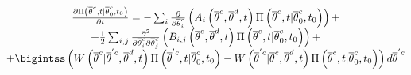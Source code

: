\begin{equation}
\label{eq:CK}
\begin{matrix}
\frac{\partial \Pi \left (\overline{\theta}^{c},t|\overline{\theta}_{0}^{c},t_{0}  
\right ) }{\partial t} = - \sum_i \frac{\partial }{\partial \overline{\theta}_{i}^{c}} \left ( A_{i}\left (  \overline{\theta}^{c}, \overline{\theta}^{d}, t\right ) \Pi \left (\overline{\theta}^{c},t|\overline{\theta}_{0}^{c},t_{0}  
\right )  \right ) + 
\\
+ \frac{1}{2}\sum_{i,j} \frac{\partial^2 }{\partial \overline{\theta}^{c}_{i} \partial \overline{\theta}^{c}_{j}}\left ( B_{i,j}\left (  \overline{\theta}^{c}, \overline{\theta}^{d}, t\right ) \Pi \left (\overline{\theta}^{c},t|\overline{\theta}_{0}^{c},t_{0}  
\right )  \right ) +
\\
+ \bigintss \left (  W\left ( \overline{\theta}^{c}|
\overline{\theta}^{'c},\overline{\theta}^{d},t \right )\Pi \left (\overline{\theta}^{'c},t|\overline{\theta}_{0}^{c},t_{0}  
\right ) - W\left ( \overline{\theta}^{'c}|
\overline{\theta}^{c},\overline{\theta}^{d},t \right )\Pi \left (\overline{\theta}^{c},t|\overline{\theta}_{0}^{c},t_{0}  
\right )  \right )d\overline{\theta}^{'c}
\end{matrix}
\end{equation}

